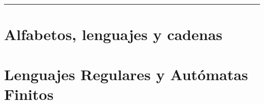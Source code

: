 \documentclass[12pt,a4paper]{book}
\begin{document}
\renewcommand{\contentsname}{\vspace{1cm} Contenido \vspace{-2cm} }


\begin{titlepage}
\vspace*{2cm}

\noindent
\vspace*{0.5cm}

\vspace{1.5cm}
\null\vfill
\vspace*{1cm}
\noindent
\hfill
\begin{minipage}{0.7\linewidth}
    \begin{flushright}
        \printauthor
    \end{flushright}
\end{minipage}
%
\begin{minipage}{0.02\linewidth}
    \rule{1pt}{140pt}
\end{minipage}
\titlepagedecoration
\end{titlepage}


\tableofcontents
\cleardoublepage


\chapter{Alfabetos, lenguajes y cadenas}

\chapter{Lenguajes Regulares y Autómatas Finitos}

\end{document}
